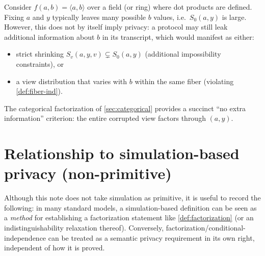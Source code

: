 \documentclass[11pt,a4paper]{article}
\theoremstyle{definition}
\theoremstyle{remark}
\begin{document}
Consider $f(a,b)=\langle a,b\rangle$ over a field (or ring) where dot products are defined. Fixing $a$ and $y$ typically leaves many possible $b$ values, i.e.\ $S_0(a,y)$ is large. However, this does not by itself imply privacy: a protocol may still leak additional information about $b$ in its transcript, which would manifest as either:
\begin{itemize}
  \item strict shrinking $S_v(a,y,v)\subsetneq S_0(a,y)$ (additional impossibility constraints), or
  \item a view distribution that varies with $b$ within the same fiber (violating \cref{def:fiber-ind}).
\end{itemize}
The categorical factorization of \cref{sec:categorical} provides a succinct ``no extra information'' criterion: the entire corrupted view factors through $(a,y)$.

\section{Relationship to simulation-based privacy (non-primitive)}
\label{sec:simulation-remark}

Although this note does not take simulation as primitive, it is useful to record the following: in many standard models, a simulation-based definition can be seen as a \emph{method} for establishing a factorization statement like \cref{def:factorization} (or an indistinguishability relaxation thereof). Conversely, factorization/conditional-independence can be treated as a semantic privacy requirement in its own right, independent of how it is proved.



\end{document}
